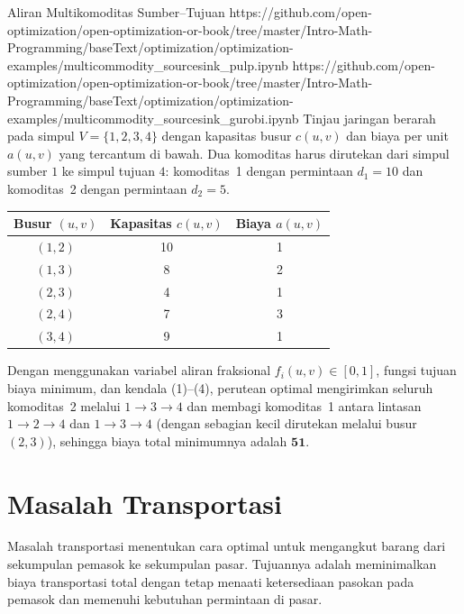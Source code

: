 \begin{examplewithallcode}{Aliran Multikomoditas Sumber--Tujuan}
{}
{https://github.com/open-optimization/open-optimization-or-book/tree/master/Intro-Math-Programming/baseText/optimization/optimization-examples/multicommodity_sourcesink_pulp.ipynb}
{https://github.com/open-optimization/open-optimization-or-book/tree/master/Intro-Math-Programming/baseText/optimization/optimization-examples/multicommodity_sourcesink_gurobi.ipynb}
Tinjau jaringan berarah pada simpul \(V=\{1,2,3,4\}\) dengan kapasitas busur \(c(u,v)\) dan biaya per unit \(a(u,v)\) yang tercantum di bawah. Dua komoditas harus dirutekan dari simpul sumber \(1\) ke simpul tujuan \(4\): komoditas~1 dengan permintaan \(d_1=10\) dan komoditas~2 dengan permintaan \(d_2=5\).

\begin{center}
\begin{tabular}{c|c|c}
Busur \((u,v)\) & Kapasitas \(c(u,v)\) & Biaya \(a(u,v)\) \\
\hline
\((1,2)\) & 10 & 1 \\
\((1,3)\) &  8 & 2 \\
\((2,3)\) &  4 & 1 \\
\((2,4)\) &  7 & 3 \\
\((3,4)\) &  9 & 1 \\
\end{tabular}
\par{}\label{tab:modeling-sums-continued-tab03}%

\end{center}

Dengan menggunakan variabel aliran fraksional \(f_i(u,v)\in[0,1]\), fungsi tujuan biaya minimum, dan kendala (1)--(4), perutean optimal mengirimkan seluruh komoditas~2 melalui \(1\to 3\to 4\) dan membagi komoditas~1 antara lintasan \(1\to 2\to 4\) dan \(1\to 3\to 4\) (dengan sebagian kecil dirutekan melalui busur \((2,3)\)), sehingga biaya total minimumnya adalah \(\mathbf{51}\).
\end{examplewithallcode}

\section{Masalah Transportasi}
\label{sec:transportation-problem}

Masalah transportasi menentukan cara optimal untuk mengangkut barang dari sekumpulan pemasok ke sekumpulan pasar. Tujuannya adalah meminimalkan biaya transportasi total dengan tetap menaati ketersediaan pasokan pada pemasok dan memenuhi kebutuhan permintaan di pasar.


